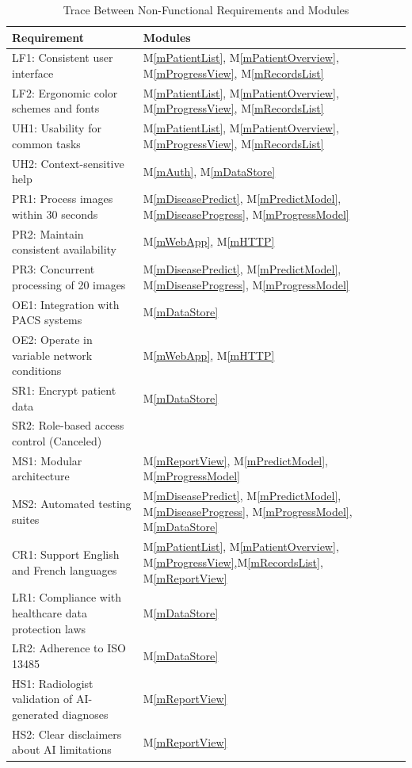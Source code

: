 \documentclass[12pt, titlepage]{article}
\newcommand{\mref}[1]{M\ref{#1}}
\begin{document}
\begin{table}[H]
\centering
\begin{tabular}{p{} p{}}
\toprule
\textbf{Requirement} & \textbf{Modules} \\
\midrule
LF1: Consistent user interface & \mref{mPatientList}, \mref{mPatientOverview}, \mref{mProgressView}, \mref{mRecordsList} \\
LF2: Ergonomic color schemes and fonts & \mref{mPatientList}, \mref{mPatientOverview}, \mref{mProgressView}, \mref{mRecordsList} \\
UH1: Usability for common tasks & \mref{mPatientList}, \mref{mPatientOverview}, \mref{mProgressView}, \mref{mRecordsList} \\
UH2: Context-sensitive help & \mref{mAuth}, \mref{mDataStore} \\
PR1: Process images within 30 seconds & \mref{mDiseasePredict}, \mref{mPredictModel}, \mref{mDiseaseProgress}, \mref{mProgressModel} \\
PR2: Maintain consistent availability & \mref{mWebApp}, \mref{mHTTP} \\
PR3: Concurrent processing of 20 images & \mref{mDiseasePredict}, \mref{mPredictModel}, \mref{mDiseaseProgress}, \mref{mProgressModel} \\
OE1: Integration with PACS systems & \mref{mDataStore} \\
OE2: Operate in variable network conditions & \mref{mWebApp}, \mref{mHTTP} \\
SR1: Encrypt patient data & \mref{mDataStore} \\
SR2: Role-based access control (Canceled) & \\
MS1: Modular architecture & \mref{mReportView}, \mref{mPredictModel}, \mref{mProgressModel} \\
MS2: Automated testing suites & \mref{mDiseasePredict}, \mref{mPredictModel}, \mref{mDiseaseProgress}, \mref{mProgressModel}, \mref{mDataStore} \\
CR1: Support English and French languages & \mref{mPatientList}, \mref{mPatientOverview}, \mref{mProgressView},\mref{mRecordsList}, \mref{mReportView} \\
LR1: Compliance with healthcare data protection laws & \mref{mDataStore} \\
LR2: Adherence to ISO 13485 & \mref{mDataStore} \\
HS1: Radiologist validation of AI-generated diagnoses & \mref{mReportView} \\
HS2: Clear disclaimers about AI limitations & \mref{mReportView} \\
\bottomrule
\end{tabular}
\caption{Trace Between Non-Functional Requirements and Modules}
\label{TblNFRModules}
\end{table}
\end{document}
